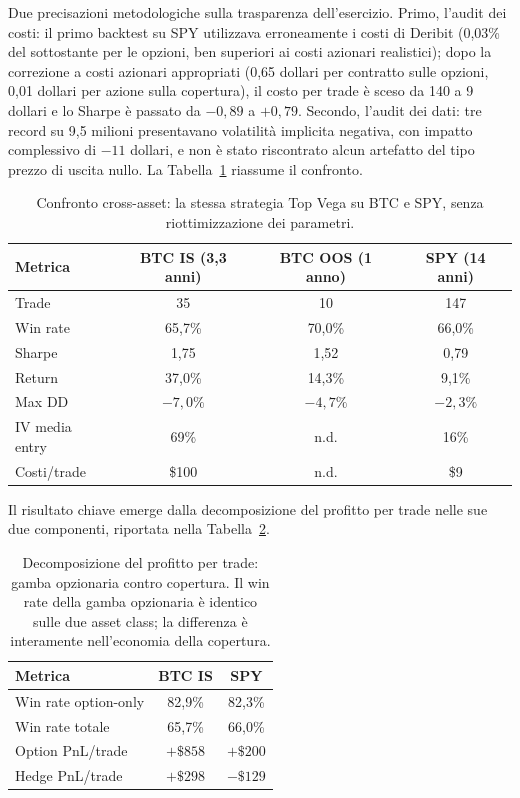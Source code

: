 Due precisazioni metodologiche sulla trasparenza dell'esercizio. Primo,
l'audit dei costi: il primo backtest su SPY utilizzava erroneamente i costi
di Deribit (0,03\% del sottostante per le opzioni, ben superiori ai costi
azionari realistici); dopo la correzione a costi azionari appropriati
(0,65 dollari per contratto sulle opzioni, 0,01 dollari per azione sulla
copertura), il costo per trade è sceso da 140 a 9 dollari e lo Sharpe è
passato da $-0{,}89$ a $+0{,}79$. Secondo, l'audit dei dati: tre record su
9,5 milioni presentavano volatilità implicita negativa, con impatto
complessivo di $-11$ dollari, e non è stato riscontrato alcun artefatto del
tipo prezzo di uscita nullo. La Tabella~\ref{tab:cross-asset} riassume il
confronto.

\begin{table}[H]
\centering
\caption{Confronto cross-asset: la stessa strategia Top Vega su BTC e SPY,
senza riottimizzazione dei parametri.}
\label{tab:cross-asset}
\setlength{\tabcolsep}{4pt}
\begin{tabular}{lccc}
\toprule
\textbf{Metrica} & \textbf{BTC IS (3,3 anni)} & \textbf{BTC OOS (1 anno)} & \textbf{SPY (14 anni)} \\
\midrule
Trade & 35 & 10 & 147 \\
Win rate & 65,7\% & 70,0\% & 66,0\% \\
Sharpe & 1,75 & 1,52 & 0,79 \\
Return & 37,0\% & 14,3\% & 9,1\% \\
Max DD & $-7{,}0\%$ & $-4{,}7\%$ & $-2{,}3\%$ \\
IV media entry & 69\% & n.d. & 16\% \\
Costi/trade & \$100 & n.d. & \$9 \\
\bottomrule
\end{tabular}
\end{table}

Il risultato chiave emerge dalla decomposizione del profitto per trade nelle
sue due componenti, riportata nella Tabella~\ref{tab:decomposizione}.

\begin{table}[H]
\centering
\caption{Decomposizione del profitto per trade: gamba opzionaria contro
copertura. Il win rate della gamba opzionaria è identico sulle due asset
class; la differenza è interamente nell'economia della copertura.}
\label{tab:decomposizione}
\begin{tabular}{lcc}
\toprule
\textbf{Metrica} & \textbf{BTC IS} & \textbf{SPY} \\
\midrule
Win rate option-only & 82,9\% & 82,3\% \\
Win rate totale & 65,7\% & 66,0\% \\
Option PnL/trade & $+\$858$ & $+\$200$ \\
Hedge PnL/trade & $+\$298$ & $-\$129$ \\
\bottomrule
\end{tabular}
\end{table}

